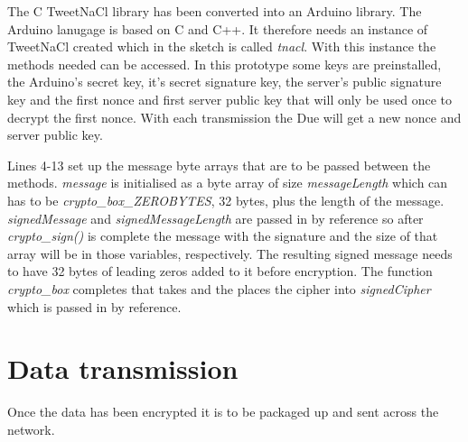 The C TweetNaCl library has been converted into an Arduino library. The Arduino lanugage is based on C and C++. It therefore needs an instance of TweetNaCl created which in the sketch is called \emph{tnacl}. With this instance the methods needed can be accessed. In this prototype some keys are preinstalled, the Arduino's secret key, it's secret signature key, the server's public signature key and the first nonce and first server public key that will only be used once to decrypt the first nonce. With each transmission the Due will get a new nonce and server public key. 

Lines 4-13 set up the message byte arrays that are to be passed between the methods. \emph{message} is initialised as a byte array of size \emph{messageLength} which can has to be \emph{crypto\_box\_ZEROBYTES}, 32 bytes, plus the length of the message. \emph{signedMessage} and \emph{signedMessageLength} are passed in by reference so after \emph{crypto\_sign()} is complete the message with the signature and the size of that array will be in those variables, respectively. The resulting signed message needs to have 32 bytes of leading zeros added to it before encryption. The function \emph{crypto\_box} completes that takes and the places the cipher into \emph{signedCipher} which is passed in by reference. 

\clearpage

\section{Data transmission}
Once the data has been encrypted it is to be packaged up and sent across the network.

